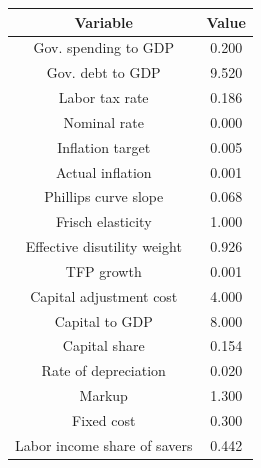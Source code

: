 \begin{table}[!ht]
\setlength\tabcolsep{0.425em}
\setlength\aboverulesep{0pt}
\setlength\belowrulesep{0.2em}
\centering
\begin{threeparttable}
\begin{tabular}{cc}
\toprule[0.1em]
Variable & Value \\[0.2em]
\midrule[0.075em]
Gov. spending to GDP & 0.200 \\[0.2em]
Gov. debt to GDP & 9.520 \\[0.2em]
Labor tax rate & 0.186 \\[0.2em]
Nominal rate & 0.000 \\[0.2em]
Inflation target & 0.005 \\[0.2em]
Actual inflation & 0.001 \\[0.2em]
Phillips curve slope & 0.068 \\[0.2em]
Frisch elasticity & 1.000 \\[0.2em]
Effective disutility weight & 0.926 \\[0.2em]
TFP growth & 0.001 \\[0.2em]
Capital adjustment cost & 4.000 \\[0.2em]
Capital to GDP & 8.000 \\[0.2em]
Capital share & 0.154 \\[0.2em]
Rate of depreciation & 0.020 \\[0.2em]
Markup & 1.300 \\[0.2em]
Fixed cost & 0.300 \\[0.2em]
Labor income share of savers & 0.442 \\[0.2em]
\bottomrule[0.1em]
\end{tabular}
\end{threeparttable}
\end{table}
